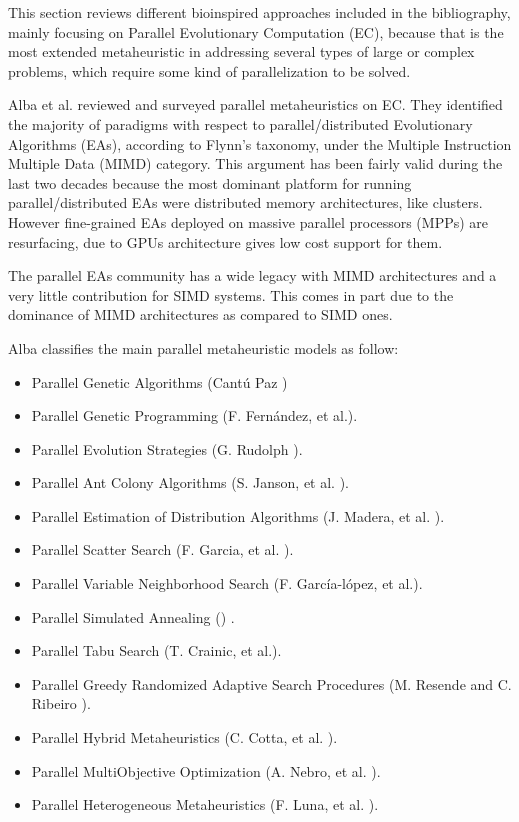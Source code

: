 \documentclass[review]{elsarticle}
\begin{document}
This section reviews different bioinspired approaches included in the bibliography, mainly focusing on Parallel Evolutionary Computation (EC), because that is the most extended metaheuristic in addressing several types of large or complex problems, which require some kind of parallelization to be solved.

Alba et al. \cite{Alba2005book} reviewed and surveyed parallel metaheuristics on EC. They identified the majority of paradigms with respect to parallel/distributed Evolutionary Algorithms (EAs), according to Flynn's taxonomy, under the Multiple Instruction Multiple Data (MIMD) category. This argument has been fairly valid during the last two decades because the most dominant platform for running parallel/distributed EAs were distributed memory architectures, like clusters. However fine-grained EAs deployed on massive parallel processors (MPPs) are resurfacing, due to GPUs architecture gives low cost support for them.

The parallel EAs community has a wide legacy with MIMD architectures and a very little contribution for SIMD systems. This comes in part due to the dominance of MIMD architectures as compared to SIMD ones.

Alba classifies the main parallel metaheuristic models as follow:
\begin{itemize}
\item Parallel Genetic Algorithms (Cant\'u Paz \cite{Cantu-Paz98asurvey}) %
\item Parallel Genetic Programming (F. Fern\'andez, et al.\cite{springerlink:10.1023_A:1021873026259}).
\item Parallel Evolution Strategies (G. Rudolph \cite{Rudolph92parallelapproaches}).
\item Parallel Ant Colony Algorithms (S. Janson, et al. \cite{ParallelAntColony}).
\item Parallel Estimation of Distribution Algorithms (J. Madera, et al. \cite{springerlink:10.1007_3_540_32494_1_7}).
\item Parallel Scatter Search (F. Garcia, et al. \cite{GarciaLopez2003575}).
\item Parallel Variable Neighborhood Search (F. Garc\'ia-l\'opez, et al.\cite{Garcia_lopez_theparallel}).
\item Parallel Simulated Annealing (\cite{Genetic_parallelsimulated}) .
\item Parallel Tabu Search (T. Crainic, et al.\cite{Crainic97towardsa}).
\item Parallel Greedy Randomized Adaptive Search Procedures (M. Resende and C. Ribeiro \cite{Resendeparallelgreedy}).
\item Parallel Hybrid Metaheuristics (C. Cotta, et al. \cite{Cotta05e:parallel}). 
\item Parallel MultiObjective Optimization (A. Nebro, et al. \cite{Nebro07mocell:a}).
\item Parallel Heterogeneous Metaheuristics (F. Luna, et al. \cite{ANL04}). 
\end{itemize}
\end{document}
